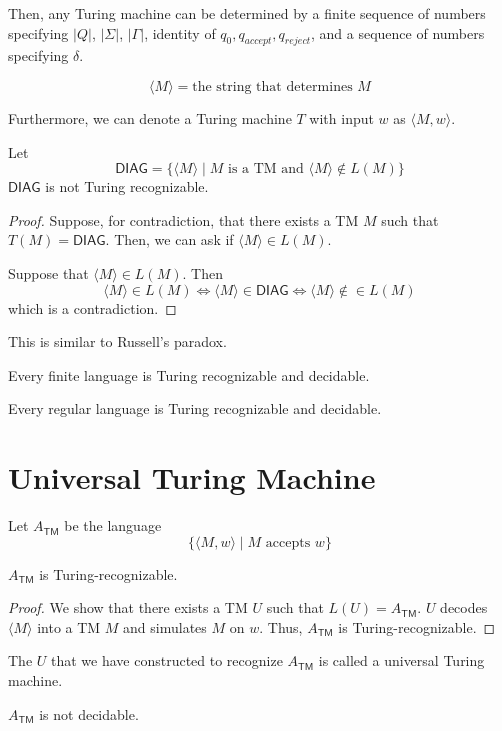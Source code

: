 Then, any Turing machine can be determined by a finite sequence of numbers specifying $|Q|$, $|\Sigma|$, $|\Gamma|$, identity of $q_0,q_{accept},q_{reject}$, and a sequence of numbers specifying $\delta$.

$$
\langle M \rangle = \text{the string that determines $M$}
$$

Furthermore, we can denote a Turing machine $T$ with input $w$ as $\langle M, w \rangle$.

\begin{theorem}
    Let
    $$
    \mathsf{DIAG} = \{ \langle M \rangle \mid \text{$M$ is a TM and $\langle M \rangle \not\in L(M)$} \}
    $$
    $\mathsf{DIAG}$ is not Turing recognizable.
\end{theorem}

\begin{proof}
    Suppose, for contradiction, that there exists a TM $M$ such that $T(M) = \mathsf{DIAG}$. Then, we can ask if $\langle M \rangle \in L(M)$.

    Suppose that $\langle M \rangle \in L(M)$. Then
    $$
    \langle M \rangle \in L(M) \iff \langle M \rangle \in \mathsf{DIAG} \iff \langle M \rangle \not\in \in L(M)
    $$
    which is a contradiction.
\end{proof}

This is similar to Russell's paradox.

\begin{theorem}
    Every finite language is Turing recognizable and decidable.
\end{theorem}

\begin{theorem}
    Every regular language is Turing recognizable and decidable.
\end{theorem}

\section{Universal Turing Machine}

Let $A_{\mathsf{TM}}$ be the language
$$
\{ \langle M,w \rangle \mid \text{$M$ accepts $w$} \}
$$

\begin{theorem}
    $A_{\mathsf{TM}}$ is Turing-recognizable.
\end{theorem}

\begin{proof}
    We show that there exists a TM $U$ such that $L(U) = A_{\mathsf{TM}}$. $U$ decodes $\langle M \rangle$ into a TM $M$ and simulates $M$ on $w$. Thus, $A_{\mathsf{TM}}$ is Turing-recognizable.
\end{proof}

The $U$ that we have constructed to recognize $A_{\mathsf{TM}}$ is called a universal Turing machine.

\begin{theorem}
    $A_{\mathsf{TM}}$ is not decidable.
\end{theorem}